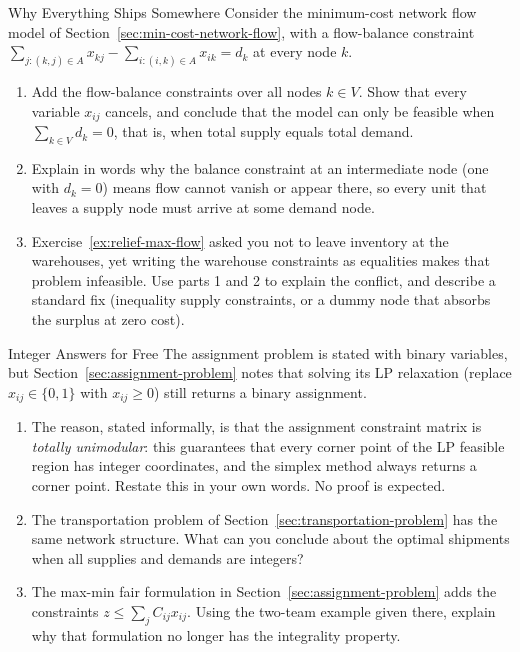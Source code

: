 
\begin{ex}{Why Everything Ships Somewhere}{}
\label{ex:flow-conservation-concept}
 Consider the minimum-cost network flow model of Section~\ref{sec:min-cost-network-flow}, with a flow-balance constraint $\sum_{j : (k,j) \in A} x_{kj} - \sum_{i : (i,k) \in A} x_{ik} = d_k$ at every node $k$.
\begin{enumerate}
\item Add the flow-balance constraints over all nodes $k \in V$.  Show that every variable $x_{ij}$ cancels, and conclude that the model can only be feasible when $\sum_{k \in V} d_k = 0$, that is, when total supply equals total demand.
\item Explain in words why the balance constraint at an intermediate node (one with $d_k = 0$) means flow cannot vanish or appear there, so every unit that leaves a supply node must arrive at some demand node.
\item Exercise~\ref{ex:relief-max-flow} asked you not to leave inventory at the warehouses, yet writing the warehouse constraints as equalities makes that problem infeasible.  Use parts 1 and 2 to explain the conflict, and describe a standard fix (inequality supply constraints, or a dummy node that absorbs the surplus at zero cost).
\end{enumerate}
\exrefs{\S\ref{sec:min-cost-network-flow}}
\end{ex}

\begin{ex}{Integer Answers for Free}{}
\label{ex:assignment-integrality-concept}
 The assignment problem is stated with binary variables, but Section~\ref{sec:assignment-problem} notes that solving its LP relaxation (replace $x_{ij} \in \{0,1\}$ with $x_{ij} \geq 0$) still returns a binary assignment.
\begin{enumerate}
\item The reason, stated informally, is that the assignment constraint matrix is \emph{totally unimodular}: this guarantees that every corner point of the LP feasible region has integer coordinates, and the simplex method always returns a corner point.  Restate this in your own words.  No proof is expected.
\item The transportation problem of Section~\ref{sec:transportation-problem} has the same network structure.  What can you conclude about the optimal shipments when all supplies and demands are integers?
\item The max-min fair formulation in Section~\ref{sec:assignment-problem} adds the constraints $z \leq \sum_j C_{ij} x_{ij}$.  Using the two-team example given there, explain why that formulation no longer has the integrality property.
\end{enumerate}
\exrefs{\S\ref{sec:assignment-problem}, \S\ref{sec:transportation-problem}}
\end{ex}

